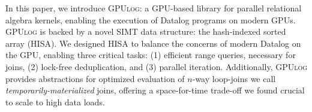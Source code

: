 \documentclass[nonacm,sigplan]{acmart}
\newcommand{\tool}{\textsc{GPUlog}}
\begin{document}
In this paper, we introduce \tool{}: a GPU-based library for parallel relational algebra kernels, enabling the execution of Datalog programs on modern GPUs. \tool{} is backed by a novel SIMT data structure: the hash-indexed sorted array (HISA). We designed HISA to balance the concerns of modern Datalog on the GPU, enabling three critical tasks: (1) efficient range queries, necessary for joins, (2) lock-free deduplication, and (3) parallel iteration. Additionally, \tool{} provides abstractions for optimized evaluation of $n$-way loop-joins we call \emph{temporarily-materialized} joins, offering a space-for-time trade-off we found crucial to scale to high data loads.

\end{document}
